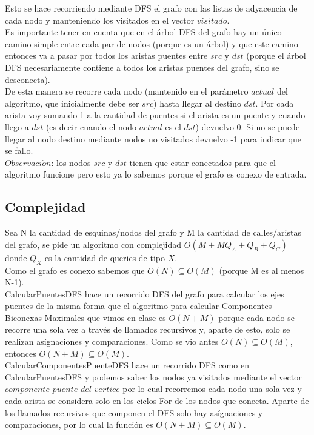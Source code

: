 Esto se hace recorriendo mediante DFS el grafo con las listas de adyacencia de cada nodo y manteniendo los visitados en el vector
$visitado$. \\
Es importante tener en cuenta que en el \'arbol DFS del grafo hay un único camino simple entre cada par de nodos (porque es un \'arbol)
y que este camino entonces va a pasar por todos los  aristas puentes entre $src$ y $dst$ (porque el \'arbol DFS necesariamente contiene
a todos los aristas puentes del grafo, sino se desconecta). \\
De esta manera se recorre cada nodo (mantenido en el parámetro $actual$ del algoritmo, que inicialmente debe ser $src$)
hasta llegar al destino $dst$. Por cada arista voy sumando 1 a la cantidad de puentes si el arista es un puente y cuando llego a $dst$ 
(es decir cuando el nodo $actual$ es el $dst$) devuelvo 0. Si no se puede llegar al nodo destino mediante nodos no visitados devuelvo -1
para indicar que se fallo. \\

$Observaci\acute{o}n$: los nodos $src$ y $dst$ tienen que estar conectados para que el algoritmo funcione pero esto ya lo sabemos
porque el grafo es conexo de entrada. \\

\subsection{Complejidad}

Sea N la cantidad de esquinas/nodos del grafo y M la cantidad de calles/aristas del grafo, se pide un algoritmo con complejidad
$O(M+MQ_A+Q_B+Q_C)$ donde $Q_X$ es la cantidad de queries de tipo $X$. \\

Como el grafo es conexo sabemos que $O(N) \subseteq O(M)$ (porque M es al menos N-1). \\

CalcularPuentesDFS hace un recorrido DFS del grafo para calcular los ejes puentes de la misma forma que el algoritmo para calcular
Componentes Biconexas Maximales que vimos en clase es $O(N+M)$ porque cada nodo se recorre una sola vez a través de llamados recursivos
y, aparte de esto, solo se realizan as\'ignaciones y comparaciones. Como se vio antes $O(N) \subseteq O(M)$, entonces $O(N+M) \subseteq O(M)$.  \\

CalcularComponentesPuenteDFS hace un recorrido DFS como en CalcularPuentesDFS y podemos saber los nodos ya visitados mediante el vector
$componente\_puente\_del\_vertice$ por lo cual recorremos cada nodo una sola vez y cada arista se considera solo en los ciclos For de
los nodos que conecta. Aparte de los llamados recursivos que componen el DFS solo hay as\'ignaciones y comparaciones, por lo cual la funci\'on
es $O(N+M) \subseteq O(M)$. \\

